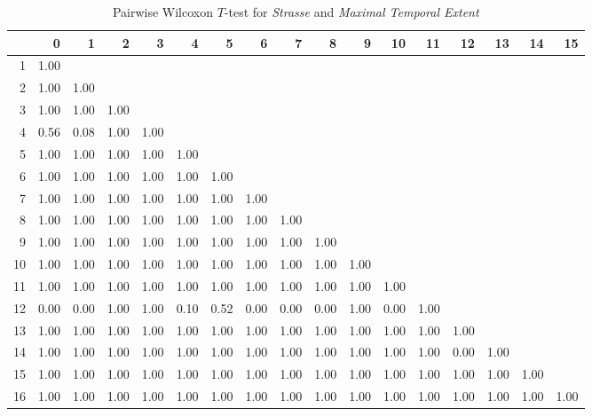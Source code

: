 \begin{table}[ht!]
	\tiny
	\setlength{\tabcolsep}{4pt}
	\centering
  \begin{tabular}{rrrrrrrrrrrrrrrrr}
    \hline
   & 0 & 1 & 2 & 3 & 4 & 5 & 6 & 7 & 8 & 9 & 10 & 11 & 12 & 13 & 14 & 15 \\ 
    \hline
  1 & 1.00 &  &  &  &  &  &  &  &  &  &  &  &  &  &  &  \\ 
    2 & 1.00 & 1.00 &  &  &  &  &  &  &  &  &  &  &  &  &  &  \\ 
    3 & 1.00 & 1.00 & 1.00 &  &  &  &  &  &  &  &  &  &  &  &  &  \\ 
    4 & 0.56 & 0.08 & 1.00 & 1.00 &  &  &  &  &  &  &  &  &  &  &  &  \\ 
    5 & 1.00 & 1.00 & 1.00 & 1.00 & 1.00 &  &  &  &  &  &  &  &  &  &  &  \\ 
    6 & 1.00 & 1.00 & 1.00 & 1.00 & 1.00 & 1.00 &  &  &  &  &  &  &  &  &  &  \\ 
    7 & 1.00 & 1.00 & 1.00 & 1.00 & 1.00 & 1.00 & 1.00 &  &  &  &  &  &  &  &  &  \\ 
    8 & 1.00 & 1.00 & 1.00 & 1.00 & 1.00 & 1.00 & 1.00 & 1.00 &  &  &  &  &  &  &  &  \\ 
    9 & 1.00 & 1.00 & 1.00 & 1.00 & 1.00 & 1.00 & 1.00 & 1.00 & 1.00 &  &  &  &  &  &  &  \\ 
    10 & 1.00 & 1.00 & 1.00 & 1.00 & 1.00 & 1.00 & 1.00 & 1.00 & 1.00 & 1.00 &  &  &  &  &  &  \\ 
    11 & 1.00 & 1.00 & 1.00 & 1.00 & 1.00 & 1.00 & 1.00 & 1.00 & 1.00 & 1.00 & 1.00 &  &  &  &  &  \\ 
    12 & 0.00 & 0.00 & 1.00 & 1.00 & 0.10 & 0.52 & 0.00 & 0.00 & 0.00 & 1.00 & 0.00 & 1.00 &  &  &  &  \\ 
    13 & 1.00 & 1.00 & 1.00 & 1.00 & 1.00 & 1.00 & 1.00 & 1.00 & 1.00 & 1.00 & 1.00 & 1.00 & 1.00 &  &  &  \\ 
    14 & 1.00 & 1.00 & 1.00 & 1.00 & 1.00 & 1.00 & 1.00 & 1.00 & 1.00 & 1.00 & 1.00 & 1.00 & 0.00 & 1.00 &  &  \\ 
    15 & 1.00 & 1.00 & 1.00 & 1.00 & 1.00 & 1.00 & 1.00 & 1.00 & 1.00 & 1.00 & 1.00 & 1.00 & 1.00 & 1.00 & 1.00 &  \\ 
    16 & 1.00 & 1.00 & 1.00 & 1.00 & 1.00 & 1.00 & 1.00 & 1.00 & 1.00 & 1.00 & 1.00 & 1.00 & 1.00 & 1.00 & 1.00 & 1.00 \\ 
     \hline
  \end{tabular}
	\caption{Pairwise Wilcoxon $T$-test for \textit{Strasse} and \textit{Maximal Temporal Extent}}
	\label{tbl:wilcoxon_baysis_matched_Strasse_TMax}
\end{table}
